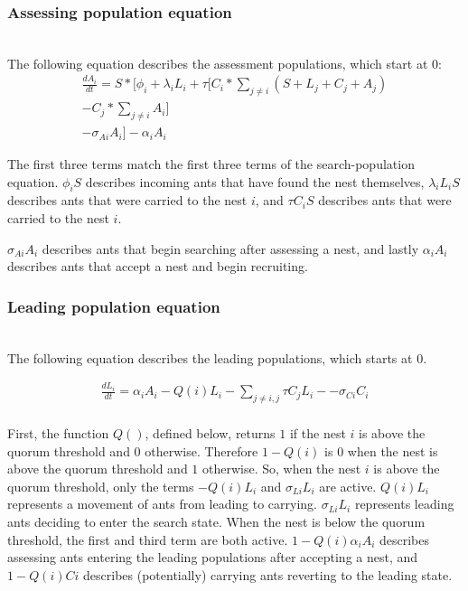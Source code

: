 \documentclass[letterpaper]{article}
\begin{document}
\subsubsection{Assessing population equation}
\hfill\\

The following equation describes the assessment populations, which start at $0$:
\begin{multline}
     \frac{dA_i}{dt} = S * [\phi_i + \lambda_iL_i + \tau \big[ C_i * \sum_{j \neq i}{(S + L_j + C_j + A_j)} \\ - C_j * \sum_{j \neq i}{A_i} \big] \\ - \sigma_{Ai}A_i] - \alpha_iA_i 
\end{multline}

The first three terms match the first three terms of the search-population equation.
$\phi_iS$ describes incoming ants that have found the nest themselves, $\lambda_iL_iS$ describes ants that were carried to the nest $i$, and $\tau C_iS$ describes ants that were carried to the nest $i$.

$\sigma_{Ai}A_i$ describes ants that begin searching after assessing a nest, and lastly $\alpha_iA_i$ describes ants that accept a nest and begin recruiting.

\subsubsection{Leading population equation}
\hfill\\

The following equation describes the leading populations, which starts at $0$.

\begin{multline}
        \frac{dL_i}{dt} = \alpha_iA_i - Q(i)L_i - \sum_{j \neq i, j} \tau C_jL_i - - \sigma_{Ci}C_i \\
\end{multline}

First, the function $Q()$, defined below, returns $1$ if the nest $i$ is above the quorum threshold and $0$ otherwise. Therefore $1 - Q(i)$ is $0$ when the nest is above the quorum threshold and $1$ otherwise.
So, when the nest $i$ is above the quorum threshold, only the terms $-Q(i)L_i$ and $\sigma_{Li}L_i$ are active. $Q(i)L_i$ represents a movement of ants from leading to carrying. $\sigma_{Li}L_i$ represents leading ants deciding to enter the search state.
When the nest is below the quorum threshold, the first and third term are both active. $1-Q(i)\alpha_iA_i$ describes assessing ants entering the leading populations after accepting a nest, and $1-Q(i)Ci$ describes (potentially) carrying ants reverting to the leading state.
\end{document}
